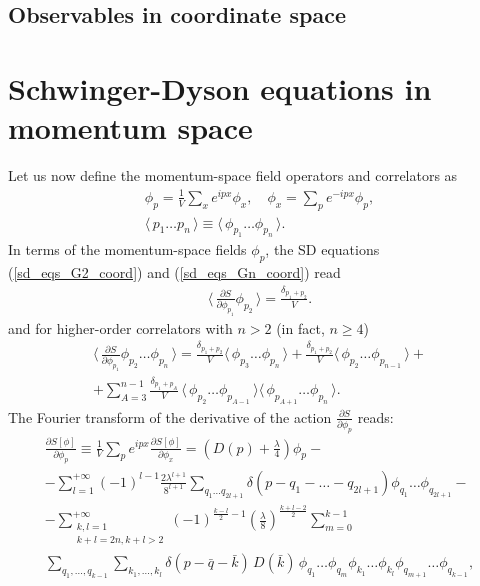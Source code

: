 \documentclass[12pt]{article}
\newcommand{\lr}[1]{ \left( #1 \right) }
\newcommand{\lrs}[1]{ \left[ #1 \right] }
\newcommand{\vev}[1]{ \langle \, #1 \, \rangle }
\begin{document}
\subsection{Observables in coordinate space}

\section{Schwinger-Dyson equations in momentum space}
\label{sec:sd_momentum}

 Let us now define the momentum-space field operators and correlators as
\begin{eqnarray}
\label{momentum_space_fields}
 \phi_p = \frac{1}{V} \sum\limits_x e^{i p x} \phi_x,
 \quad
 \phi_x = \sum\limits_p e^{-i p x} \phi_p ,
 \nonumber \\
 \vev{p_1 \ldots p_n} \equiv \vev{\phi_{p_1} \ldots \phi_{p_n}} .
\end{eqnarray}
In terms of the momentum-space fields $\phi_p$, the SD equations (\ref{sd_eqs_G2_coord}) and (\ref{sd_eqs_Gn_coord}) read
\begin{eqnarray}
\label{sd_eqs_G2_mom}
 \vev{\frac{\partial S}{\partial \phi_{p_1}} \phi_{p_2} } = \frac{\delta_{p_1 + p_2}}{V}  .
\end{eqnarray}
and for higher-order correlators with $n > 2$ (in fact, $n \geq 4$)
\begin{eqnarray}
\label{sd_eqs_Gn_mom}
 \vev{\frac{\partial S}{\partial \phi_{p_1}} \phi_{p_2} \ldots \phi_{p_n} }
 =
 \frac{\delta_{p_1 + p_2}}{V} \vev{\phi_{p_3} \ldots \phi_{p_n}}
 +
 \frac{\delta_{p_1 + p_2}}{V} \vev{\phi_{p_2} \ldots \phi_{p_{n-1}}}
 + \nonumber \\ +
 \sum\limits_{A=3}^{n-1} \frac{\delta_{p_1 + p_A}}{V} \,
 \vev{\phi_{p_2} \ldots \phi_{p_{A-1}}}
 \vev{\phi_{p_{A+1}} \ldots \phi_{p_n}} .
\end{eqnarray}
The Fourier transform of the derivative of the action $\frac{\partial S}{\partial \phi_p}$ reads:
\begin{eqnarray}
\label{dSdphi_mom}
 \frac{\partial S\lrs{\phi}}{\partial \phi_p}
 \equiv
 \frac{1}{V} \sum\limits_p e^{i p x} \frac{\partial S\lrs{\phi}}{\partial \phi_x}
 =
 \lr{D\lr{p} + \frac{\lambda}{4}} \phi_p
 - \nonumber \\ -
 \sum\limits_{l=1}^{+\infty} \lr{-1}^{l-1} \frac{2 \lambda^{l+1}}{8^{l+1}}
 \sum\limits_{q_1 \ldots q_{2 l + 1}}
 \delta\lr{p - q_1 - \ldots - q_{2 l + 1}}
 \phi_{q_1} \ldots \phi_{q_{2 l + 1}}
 - \nonumber \\ -
 \sum\limits_{\substack{k,l=1\\k+l=2 n,k+l>2}}^{+\infty}
 \lr{-1}^{\frac{k-l}{2}-1} \lr{\frac{\lambda}{8}}^{\frac{k+l-2}{2}}
 \sum\limits_{m=0}^{k-1}
 \nonumber \\
 \sum\limits_{q_1, \ldots, q_{k-1}}
 \sum\limits_{k_1, \ldots, k_l}
 \delta\lr{p - \bar{q} - \bar{k}} \, D\lr{\bar{k}} \,
 \phi_{q_1} \ldots \phi_{q_m}
 \phi_{k_1} \ldots \phi_{k_l}
 \phi_{q_{m+1}} \ldots \phi_{q_{k-1}} ,
\end{eqnarray}
\end{document}
